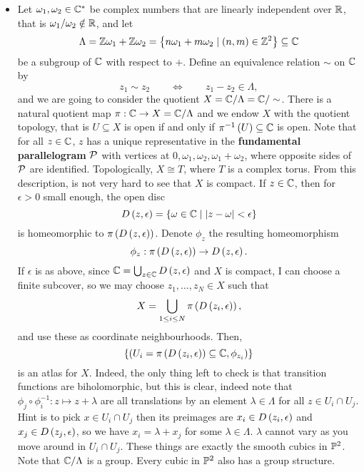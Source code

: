 \begin{example}
\begin{itemize}
\item Let $ \omega_1, \omega_2 \in \C^* $ be complex numbers that are linearly independent over $ \R $, that is $ \omega_1 / \omega_2 \notin \R $, and let
$$ \Lambda = \Z\omega_1 + \Z\omega_2 = \cb{n\omega_1 + m\omega_2 \mid \rb{n, m} \in \Z^2} \subseteq \C $$
be a subgroup of $ \C $ with respect to $ + $. Define an equivalence relation $ \sim $ on $ \C $ by
$$ z_1 \sim z_2 \qquad \iff \qquad z_1 - z_2 \in \Lambda, $$
and we are going to consider the quotient $ X = \C / \Lambda = \C / \sim $. There is a natural quotient map $ \pi : \C \to X = \C / \Lambda $ and we endow $ X $ with the quotient topology, that is $ U \subseteq X $ is open if and only if $ \pi^{-1}\rb{U} \subseteq \C $ is open. Note that for all $ z \in \C $, $ z $ has a unique representative in the \textbf{fundamental parallelogram} $ \PP $ with vertices at $ 0, \omega_1, \omega_2, \omega_1 + \omega_2 $, where opposite sides of $ \PP $ are identified. Topologically, $ X \cong T $, where $ T $ is a complex torus. From this description, is not very hard to see that $ X $ is compact. If $ z \in \C $, then for $ \epsilon > 0 $ small enough, the open disc
$$ D\rb{z, \epsilon} = \cb{\omega \in \C \mid \abs{z - \omega} < \epsilon} $$
is homeomorphic to $ \pi\rb{D\rb{z, \epsilon}} $. Denote $ \phi_z $ the resulting homeomorphism
$$ \phi_z : \pi\rb{D\rb{z, \epsilon}} \to D\rb{z, \epsilon}. $$
If $ \epsilon $ is as above, since $ \C = \bigcup_{z \in \C} D\rb{z, \epsilon} $ and $ X $ is compact, I can choose a finite subcover, so we may choose $ z_1, \dots, z_N \in X $ such that
$$ X = \bigcup_{1 \le i \le N} \pi\rb{D\rb{z_i, \epsilon}}, $$
and use these as coordinate neighbourhoods. Then,
$$ \cb{\rb{U_i = \pi\rb{D\rb{z_i, \epsilon}} \subseteq \C, \phi_{z_i}}} $$
is an atlas for $ X $. Indeed, the only thing left to check is that transition functions are biholomorphic, but this is clear, indeed note that $ \phi_j \circ \phi_i^{-1} : z \mapsto z + \lambda $ are all translations by an element $ \lambda \in \Lambda $ for all $ z \in U_i \cap U_j $. Hint is to pick $ x \in U_i \cap U_j $ then its preimages are $ x_i \in D\rb{z_i, \epsilon} $ and $ x_j \in D\rb{z_j, \epsilon} $, so we have $ x_i = \lambda + x_j $ for some $ \lambda \in \Lambda $. $ \lambda $ cannot vary as you move around in $ U_i \cap U_j $. These things are exactly the smooth cubics in $ \P^2 $. Note that $ \C / \Lambda $ is a group. Every cubic in $ \P^2 $ also has a group structure.
\end{itemize}
\end{example}

